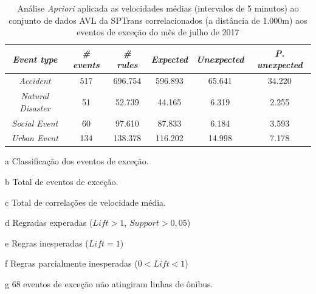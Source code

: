\documentclass[
	12pt,				%
	oneside,			%
	a4paper,			%
	english,			%
	brazil				%
	]{abntex2ppgsi}
\begin{document}
\begin{apendicesenv}
\begin{table}[!htb]
\centering
\begin{threeparttable}
\caption {Análise \textit{Apriori} aplicada as velocidades médias (intervalos de 5 minutos) ao conjunto de dados AVL da SPTrans correlacionados (a distância de 1.000m) aos eventos de exceção do mês de julho de 2017}
\label {tab:aprioriFull}
\begin{tabular}{c|c|c|c|c|c}
\hline
\textbf{\textit{Event type}}\tnote{a} & \textbf{\textit{\# events}}\tnote{b} & \textit{\textbf{\# rules}}\tnote{c} & \textbf{\textit{Expected}}\tnote{d} & \textbf{\textit{Unexpected}}\tnote{e} & \textbf{\textit{P. unexpected}}\tnote{f}   \\
\hline
\textit{Accident} & 517 & 696.754 & 596.893 & 65.641 & 34.220 \\
\textit{Natural Disaster} & 51 & 52.739 & 44.165 & 6.319 & 2.255 \\
\textit{Social Event} & 60 & 97.610 & 87.833 & 6.184 & 3.593 \\
\textit{Urban Event} & 134 & 138.378 & 116.202 & 14.998 & 7.178 \\
\hline
\end{tabular}
\begin{tablenotes}
            \item[a] Classificação dos eventos de exceção.
            \item[b] Total de eventos de exceção.
            \item[c] Total de correlações de velocidade média.
            \item[d] Regradas experadas ($Lift > 1$, $Support > 0,05$)
            \item[e] Regras inesperadas ($Lift = 1$)
            \item[f] Regras parcialmente inesperadas ($0 < Lift < 1$)
            \item[g] 68 eventos de exceção não atingiram linhas de ônibus.
        \end{tablenotes}
\end{threeparttable}
\end{table}



\end{apendicesenv}
\end{document}
